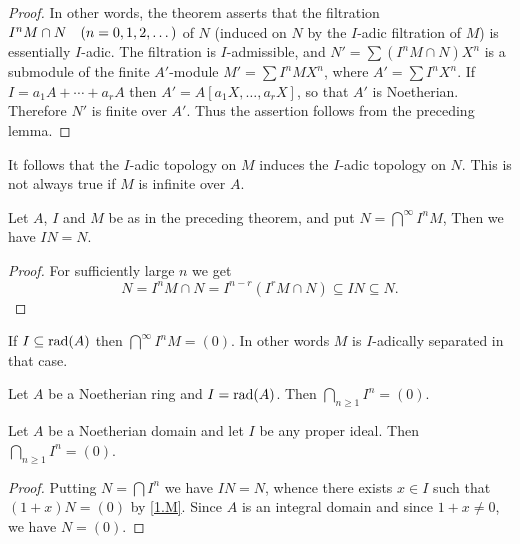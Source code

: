 \documentclass[../main]{subfiles}
\begin{document}
\begin{proof}
In other words, the theorem asserts that the filtration \newline $I^nM \cap N\for{n=0,1,2, \ldots}$ of $N$ (induced on $N$ by the $I$-adic filtration of $M$) is essentially $I$-adic. The filtration is $I$-admissible, and $N'=\sum(I^n M \cap N) X^n$ is a submodule of the finite $A'$-module $M'=\sum I^n M X^n$, where $A'=\sum I^n X^n$. If $I=a_1 A+\cdots+a_rA$ then $A'=A[a_1 X, \ldots, a_r X]$, so that $A'$ is Noetherian. Therefore $N'$ is finite over $A'$. Thus the assertion follows from the preceding lemma.
\end{proof}

\begin{remark}
It follows that the $I$-adic topology on $M$ induces the $I$-adic topology on $N$. This is not always true if $M$ is infinite over $A$.
\end{remark}

\begin{partheorem}\label{thm:016}
Let $A$, $I$ and $M$ be as in the preceding theorem, and put $N=\bigcap^\infty I^nM$, Then we have $IN=N$.
\end{partheorem}

\begin{proof}
For sufficiently large $n$ we get \[N=I^n M \cap N=I^{n-r}(I^r M \cap N) \subseteq IN \subseteq N.\]
\end{proof} 

\begin{corollary}\label{cor:11.01}
If $I \subseteq \operatorname{rad}(A)$ then $\displaystyle \bigcap^\infty I^n M=(0)$. In other words $M$ is $I$-adically separated in that case.
\end{corollary}

\begin{corollary}[Krull]\label{cor:11.02}
Let $A$ be a Noetherian ring and $I=\operatorname{rad}(A)$. Then $\displaystyle\bigcap_{n\ge1}I^n=(0)$.
\end{corollary}

\begin{corollary}[Krull]\label{cor:11.03}
Let $A$ be a Noetherian domain and let $I$ be any proper ideal. Then $\displaystyle \bigcap_{n\ge1} I^n=(0)$.
\end{corollary}

\begin{proof}
Putting $N=\bigcap I^n$ we have $IN=N$, whence there exists $x \in I$ such that $(1+x) N=(0)$ by \ref{1.M}. Since $A$ is an integral domain and since $1+x\neq 0$, we have $N=(0)$.
\end{proof}
\end{document}

